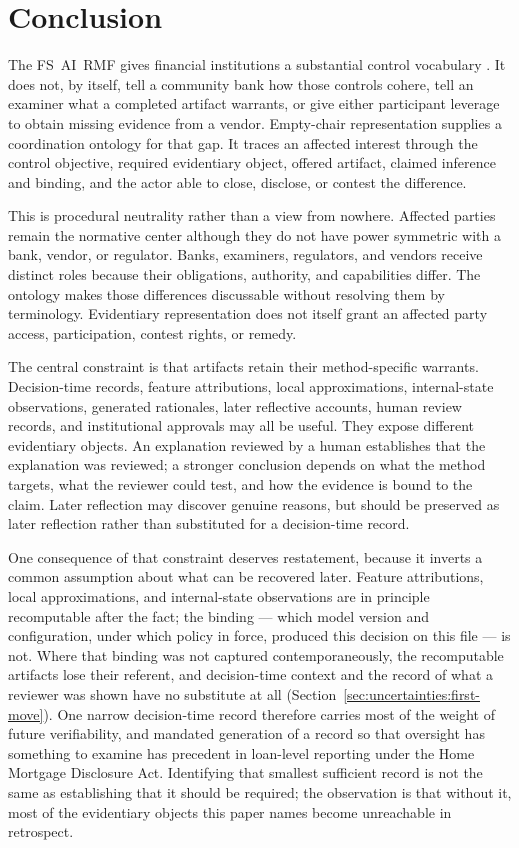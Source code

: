 
\section{Conclusion}
\label{sec:implications}

The FS~AI~RMF gives financial institutions a substantial control vocabulary
\parencite{treasuryFSAIRMFRelease2026}. It does not, by itself, tell a community
bank how those controls cohere, tell an examiner what a completed artifact
warrants, or give either participant leverage to obtain missing evidence from a
vendor. Empty-chair representation supplies a coordination ontology for that
gap. It traces an affected interest through the control objective, required
evidentiary object, offered artifact, claimed inference and binding, and the
actor able to close, disclose, or contest the difference.

This is procedural neutrality rather than a view from nowhere. Affected parties
remain the normative center although they do not have power symmetric with a
bank, vendor, or regulator. Banks, examiners, regulators, and vendors receive
distinct roles because their obligations, authority, and capabilities differ.
The ontology makes those differences discussable without resolving them by
terminology. Evidentiary representation does not itself grant an affected party
access, participation, contest rights, or remedy.

The central constraint is that artifacts retain their method-specific warrants.
Decision-time records, feature attributions, local approximations,
internal-state observations, generated rationales, later reflective accounts,
human review records, and institutional approvals may all be useful. They
expose different evidentiary objects. An explanation reviewed by a human
establishes that the explanation was reviewed; a stronger conclusion depends on
what the method targets, what the reviewer could test, and how the evidence is
bound to the claim. Later reflection may discover genuine reasons, but should
be preserved as later reflection rather than substituted for a decision-time
record.

One consequence of that constraint deserves restatement, because it inverts a
common assumption about what can be recovered later. Feature attributions,
local approximations, and internal-state observations are in principle
recomputable after the fact; the binding --- which model version and
configuration, under which policy in force, produced this decision on this
file --- is not. Where that binding was not captured contemporaneously, the
recomputable artifacts lose their referent, and decision-time context and the
record of what a reviewer was shown have no substitute at all
(Section~\ref{sec:uncertainties:first-move}). One narrow decision-time record
therefore carries most of the weight of future verifiability, and mandated
generation of a record so that oversight has something to examine has
precedent in loan-level reporting under the Home Mortgage Disclosure Act.
Identifying that smallest sufficient record is not the same as establishing
that it should be required; the observation is that without it, most of the
evidentiary objects this paper names become unreachable in retrospect.

